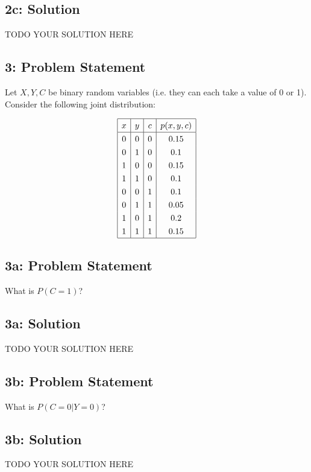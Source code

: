 \documentclass[10pt]{article}
\newcommand{\officialdirections}[1]{{\color{purple} #1}}
\begin{document}
\subsection{2c: Solution}
TODO YOUR SOLUTION HERE



\newpage
\officialdirections{
\subsection*{3: Problem Statement}
Let $X,Y,C$ be binary random variables (i.e. they can each take a value of 0 or 1). Consider the following joint distribution:

$$
\def\arraystretch{1.3}
\begin{array}{|c|c|c|c|}
\hline
x & y & c & p(x,y,c) \\
\hline
0 & 0 & 0 & 0.15 \\
0 & 1 & 0 & 0.1 \\
1 & 0 & 0 & 0.15 \\
1 & 1 & 0 & 0.1 \\
0 & 0 & 1 & 0.1 \\
0 & 1 & 1 & 0.05 \\
1 & 0 & 1 & 0.2 \\
1 & 1 & 1 & 0.15 \\
\hline
\end{array}
$$
}

\officialdirections{\subsection*{3a: Problem Statement}
What is $P(C=1)$?
}

\subsection{3a: Solution}

TODO YOUR SOLUTION HERE

\newpage
\officialdirections{\subsection*{3b: Problem Statement}
What is $P(C=0|Y=0)$?
}

\subsection{3b: Solution}

TODO YOUR SOLUTION HERE
\end{document}
